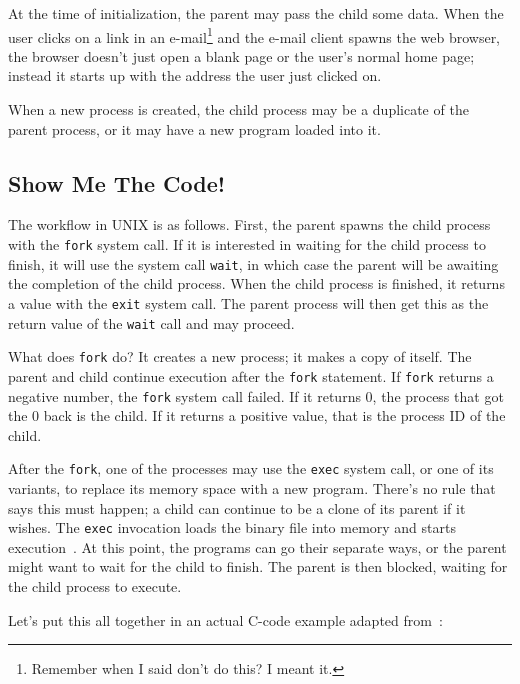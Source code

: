 At the time of initialization, the parent may pass the child some data. When the user clicks on a link in an e-mail\footnote{Remember when I said don't do this? I meant it.} and the e-mail client spawns the web browser, the browser doesn't just open a blank page or the user's normal home page; instead it starts up with the address the user just clicked on.

When a new process is created, the child process may be a duplicate of the parent process, or it may have a new program loaded into it.


\subsection*{Show Me The Code!}

The workflow in UNIX is as follows. First, the parent spawns the child process with the \texttt{fork} system call. If it is interested in waiting for the child process to finish, it will use the system call \texttt{wait}, in which case the parent will be awaiting the completion of the child process. When the child process is finished, it returns a value with the \texttt{exit} system call. The parent process will then get this as the return value of the \texttt{wait} call and may proceed.

What does \texttt{fork} do? It creates a new process; it makes a copy of itself. The parent and child continue execution after the \texttt{fork} statement. If \texttt{fork} returns a negative number, the \texttt{fork} system call failed. If it returns 0, the process that got the 0 back is the child. If it returns a positive value, that is the process ID of the child.

After the \texttt{fork}, one of the processes may use the \texttt{exec} system call, or one of its variants, to replace its memory space with a new program. There's no rule that says this must happen; a child can continue to be a clone of its parent if it wishes. The \texttt{exec} invocation loads the binary file into memory and starts execution~\cite{osc}. At this point, the programs can go their separate ways, or the parent might want to wait for the child to finish. The parent is then blocked, waiting for the child process to execute.

Let's put this all together in an actual C-code example adapted from~\cite{osc}:

